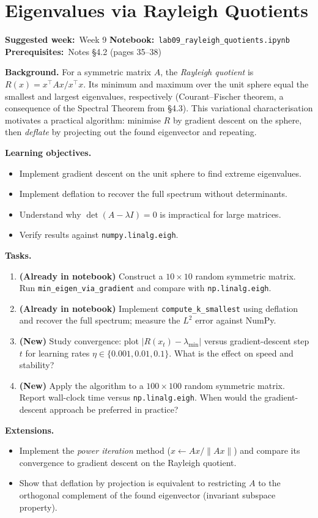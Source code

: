 \documentclass[11pt, a4paper]{article}
\newcommand{\labmeta}[3]{%
  \begin{prereqbox}
  \textbf{Suggested week:}~#1 \quad
  \textbf{Notebook:}~\texttt{#2} \quad
  \textbf{Prerequisites:}~#3
  \end{prereqbox}
  \vspace{4pt}
}
\newcommand{\objectives}[1]{%
  \textbf{\color{prereqcolor}Learning objectives.}\vspace{2pt}
  \begin{itemize}[leftmargin=1.6em, itemsep=1pt] #1 \end{itemize}
}
\newcommand{\tasks}[1]{%
  \begin{taskbox}
  \textbf{\color{taskcolor}Tasks.}
  \begin{enumerate}[leftmargin=1.6em, itemsep=3pt] #1 \end{enumerate}
  \end{taskbox}
}
\newcommand{\extensions}[1]{%
  \textbf{\color{notecolor}Extensions.}
  \begin{itemize}[leftmargin=1.6em, itemsep=1pt] #1 \end{itemize}
}
\begin{document}
\section{Eigenvalues via Rayleigh Quotients}
\label{lab:rayleigh}

\labmeta{Week 9}{lab09\_rayleigh\_quotients.ipynb}{Notes §4.2 (pages 35--38)}

\vspace{4pt}

\noindent\textbf{Background.}
For a symmetric matrix $A$, the \emph{Rayleigh quotient} is
$R(x) = x^\top A x / x^\top x$.  Its minimum and maximum over the unit sphere
equal the smallest and largest eigenvalues, respectively (Courant--Fischer theorem,
a consequence of the Spectral Theorem from §4.3).
This variational characterisation motivates a practical algorithm: minimise $R$
by gradient descent on the sphere, then \emph{deflate} by projecting out the
found eigenvector and repeating.

\objectives{
  \item Implement gradient descent on the unit sphere to find extreme eigenvalues.
  \item Implement deflation to recover the full spectrum without determinants.
  \item Understand why $\det(A - \lambda I) = 0$ is impractical for large matrices.
  \item Verify results against \texttt{numpy.linalg.eigh}.
}

\tasks{
  \item \textbf{(Already in notebook)} Construct a $10\times 10$ random symmetric matrix.
        Run \texttt{min\_eigen\_via\_gradient} and compare with \texttt{np.linalg.eigh}.
  \item \textbf{(Already in notebook)} Implement \texttt{compute\_k\_smallest} using
        deflation and recover the full spectrum; measure the $L^2$ error against NumPy.
  \item \textbf{(New)} Study convergence: plot $|R(x_t) - \lambda_{\min}|$ versus
        gradient-descent step $t$ for learning rates $\eta \in \{0.001, 0.01, 0.1\}$.
        What is the effect on speed and stability?
  \item \textbf{(New)} Apply the algorithm to a $100\times 100$ random symmetric matrix.
        Report wall-clock time versus \texttt{np.linalg.eigh}. When would the
        gradient-descent approach be preferred in practice?
}

\extensions{
  \item Implement the \emph{power iteration} method ($x \leftarrow Ax/\|Ax\|$) and
        compare its convergence to gradient descent on the Rayleigh quotient.
  \item Show that deflation by projection is equivalent to restricting $A$ to the
        orthogonal complement of the found eigenvector (invariant subspace property).
}
\end{document}
